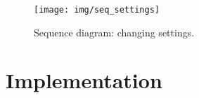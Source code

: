 \begin{figure}%
	\begin{center}
		\texttt{[image: img/seq\_settings]}%
	\end{center}
	\caption{Sequence diagram: changing settings.}%
	\label{fig:sequence:settings}%
\end{figure}



\section{Implementation}\label{chapter:implementation:section:implementation}








